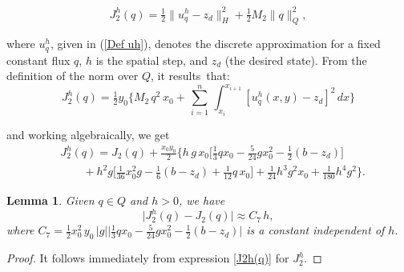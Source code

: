 \documentclass[11pt]{article}
\newtheorem{Lemma}{Lemma}
\begin{document}
     \[{J^h_2} (q)=  \tfrac{1}{2} \lVert {u^h_q} - z_d \rVert^2_H +  \tfrac{1}{2} M_2 \lVert q \rVert ^2_Q ,\]
     
 \noindent where ${u^h_q}$, given in (\ref{Def uh}), {denotes the discrete approximation for a fixed constant flux $q$}, $h$ is the spatial step, and $z_d$ (the desired state).
 From the definition of the norm over $Q$, it results~that:   
    \[{J^h_2} (q)= \tfrac{1}{2} y_0 \Big\{M_2\,q^2 \,x_0 + \, \sum_{i=1}^n \, \int_{x_i}^{x_{i+1}} [{u^h_q} (x,y) - z_d]^2 \,dx \Big \}\]
     
  \noindent and working algebraically, we get
  \begin{equation}\label{J2h(q)}
    \begin{array}{ll}
  &  {J^h_2}(q)=J_2(q)+\tfrac{x_0 y_0}{2}\Big\{  h \,g \,x_0 \Big[\tfrac{1}{3}q x_0 - \tfrac{5}{24} g x_0^2 - \tfrac{1}{2} (b-z_d)\Big] \\[0.45cm]
    & \qquad + h^2 g \Big[\tfrac{1}{36} x_0^2 g- \tfrac{1}{6}(b-z_d) + \tfrac{1}{12} q \,x_0\Big] + \tfrac{1}{24}  h^3g^2 x_0 + \tfrac{1}{180}  h^4  g^2\Big\}.    
    \end{array}    
  \end{equation}

\begin{Lemma}\label{Lema J2 J2h}
Given $q\in Q$ and $h>0$, we have
     \begin{equation}\label{ec 4.3} 
        \lvert  {J^h_2}(q) - J_2(q) \rvert  \approx C_7 \, h,
     \end{equation}
     where $C_7 = \tfrac{1}{2}x_0^2\, y_0\,|g| \Big \lvert  \tfrac{1}{3}q x_0-\tfrac{5}{24} gx_0^2-\tfrac{1}{2}(b-z_d) \Big \rvert$ is a constant independent of $h.$
      \end{Lemma}
      
\begin{proof}
It follows immediately from expression \eqref{J2h(q)} for ${J^h_2}$.
   \end{proof}

     
  
 
      
\end{document}
